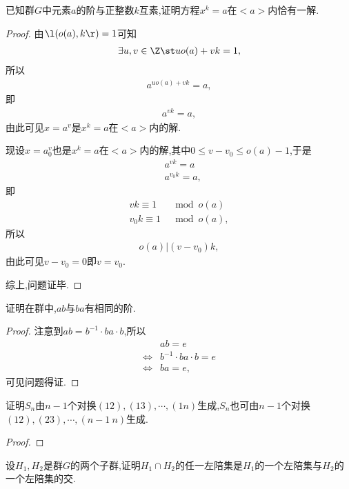 \begin{problem}[P97T3]
    已知群$G$中元素$a$的阶与正整数$k$互素,证明方程$x^k=a$在$<a>$内恰有一解.
\end{problem}
\begin{proof}
    由$\l(o(a),k\r)=1$可知\begin{align*}
        \exists u,v\in \Z\st uo(a)+vk=1,
    \end{align*}所以\begin{align*}
        a^{uo(a)+vk}=a,
    \end{align*}即\begin{align*}
        a^{vk}=a,
    \end{align*}由此可见$x=a^v$是$x^k=a$在$<a>$内的解.

    现设$x=a^v_0$也是$x^k=a$在$<a>$内的解,其中$0\leq v-v_0\leq o(a)-1$,于是\begin{align*}
        &a^{vk}=a\\
        &a^{v_0k}=a,
    \end{align*}即\begin{align*}
        vk\equiv1&\mod o(a)\\
        v_0k\equiv1&\mod o(a),
    \end{align*}所以\begin{align*}
    o(a)|(v-v_0)k,
    \end{align*}由此可见$v-v_0=0$即$v=v_0$.

    综上,问题证毕.
\end{proof}
\begin{problem}[P97T4]
    证明在群中,$ab$与$ba$有相同的阶.
\end{problem}
\begin{proof}
    注意到$ab=b^{-1}\cdot ba\cdot b$,所以\begin{align*}
        &ab=e\\
        \iff&b^{-1}\cdot ba\cdot b=e\\
        \iff&ba=e,
    \end{align*}可见问题得证.
\end{proof}
\begin{problem}[P97T10]
    证明$S_n$由$n-1$个对换$(12),(13),\cdots,(1n)$生成,$S_n$也可由$n-1$个对换$(12),(23),\cdots,(n-1\ n)$生成.
\end{problem}
\begin{proof}
    \stars
\end{proof}
\begin{problem}[P97T16]
    设$H_1,H_2$是群$G$的两个子群,证明$H_1\cap H_2$的任一左陪集是$H_1$的一个左陪集与$H_2$的一个左陪集的交.
\end{problem}
